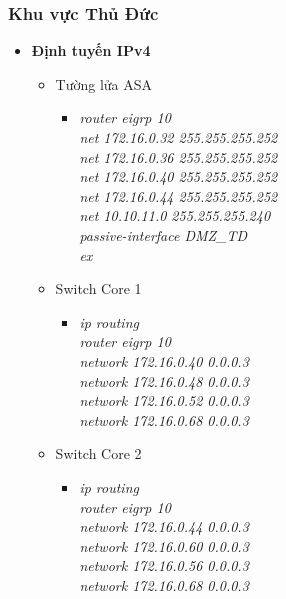 \documentclass[a4paper, 12pt]{article}
\begin{document}
\subsubsection{Khu vực Thủ Đức}
\renewcommand{\labelitemi}{$\blacksquare$}
\renewcommand\labelitemii{$\nabla$}
\renewcommand\labelitemiii{$\square$}
\begin{itemize}
      \item \textbf{Định tuyến IPv4}
      
      \begin{itemize}
        \item Tường lửa ASA 
        \begin{itemize}
          \item \textit{router eigrp 10\\
                    	net 172.16.0.32 255.255.255.252 \\
                        net 172.16.0.36 255.255.255.252 \\
                        net 172.16.0.40 255.255.255.252 \\
                        net 172.16.0.44 255.255.255.252 \\
                        net 10.10.11.0 255.255.255.240 \\
                        passive-interface DMZ\_TD\\
                        ex\\}
        
        \end{itemize}
      
           \item Switch Core 1
        \begin{itemize}
         \item \textit{ip routing\\
                        router eigrp 10\\
                        network 172.16.0.40 0.0.0.3\\
                        network 172.16.0.48 0.0.0.3\\
                        network 172.16.0.52 0.0.0.3\\
                        network 172.16.0.68 0.0.0.3\\}
         
          \end{itemize}
             \item Switch Core 2
        \begin{itemize}
         \item \textit{ip routing\\
                        router eigrp 10\\
                        network 172.16.0.44 0.0.0.3\\
                        network 172.16.0.60 0.0.0.3\\
                        network 172.16.0.56 0.0.0.3\\
                        network 172.16.0.68 0.0.0.3\\}
         

\end{itemize}
\end{itemize}
\end{itemize}
\end{document}
